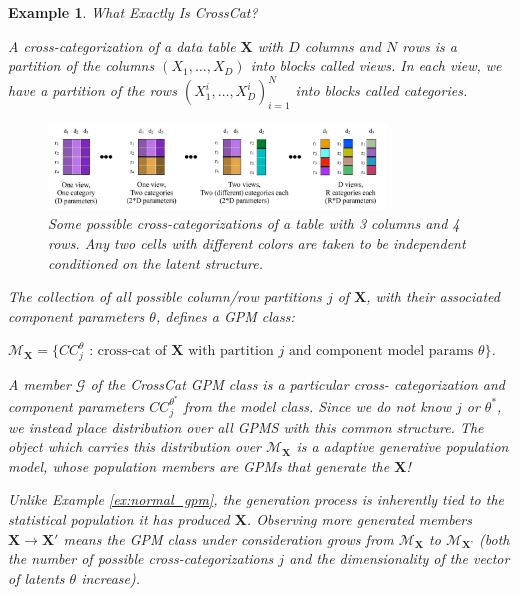 \documentclass[10pt,letterpaper]{article}
\newtheorem{example}{Example}[section]
\newcommand{\set}[1]{\{#1\}}
\begin{document}
\begin{example} \label{ex:crosscat} What Exactly Is CrossCat?

A cross-categorization of a data table $\mathbf{X}$ with $D$ columns and $N$ rows is
a partition of the columns $(X_1,\dots,X_D)$ into blocks called \textit{views}.
In each view, we have a partition of the rows $(X_1^{i},\dots,X_D^{i})_{i=1}^N$
into blocks called \textit{categories}.

\begin{figure}[ht]
    \centering
\includegraphics[width=0.8\textwidth]{cc.jpeg}
\caption{Some possible cross-categorizations of a table with 3 columns
  and 4 rows.  Any two cells with different colors are taken to be
  independent conditioned on the latent structure.}
\label{fig:cc}
\end{figure}
The collection of all possible column/row partitions $j$ of
$\mathbf{X}$, with their associated component parameters $\theta$,
defines a GPM class:

$\mathcal{M}_\textbf{X} = \set{CC_j^{\theta} \text{ : cross-cat of } \mathbf{X}
\text{ with partition } j \text{ and component model params } \theta}$.

A member $\mathcal{G}$ of the CrossCat GPM class is a particular cross-
categorization and component parameters $CC_j^{\theta^*}$ from the model class.
Since we do not know $j$ or $\theta^*$, we instead place distribution over all
GPMS with this common structure. The object which carries this distribution over
$\mathcal{M}_\textbf{X}$ is a adaptive generative population model, whose
population members are GPMs that generate the $\mathbf{X}$!

Unlike Example \ref{ex:normal_gpm}, the generation process is inherently tied to
the statistical population it has produced $\mathbf{X}$. Observing more
generated members $\mathbf{X} \to
\mathbf{X}'$ means the GPM class under consideration grows from
$\mathcal{M}_\textbf{X}$ to $\mathcal{M}_\textbf{X'}$ (both the number of
possible cross-categorizations $j$ and the dimensionality of the vector of
latents $\theta$ increase).

\end{example}
\end{document}
